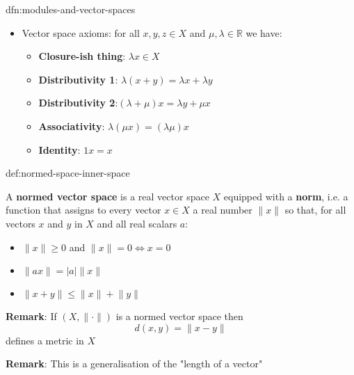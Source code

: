 \documentclass[landscape, 8pt]{extarticle}
\begin{document}
\begin{multicols}{3}
\begin{dfn}{dfn:modules-and-vector-spaces}{}
\begin{itemize}[leftmargin=*]
            \item Vector space axioms: for all $x,y,z\in X$ and $\mu, \lambda \in \mathbb{R}$ we have:
                \vspace{-5pt}
                \begin{itemize}
                    \item \textbf{Closure-ish thing}: $\lambda x\in X$
                    \item \textbf{Distributivity 1}: $\lambda(x + y) = \lambda x + \lambda y$
                    \item \textbf{Distributivity 2}:$(\lambda + \mu)x = \lambda y + \mu x$
                    \item \textbf{Associativity}: $\lambda (\mu x) = (\lambda \mu) x$
                    \item \textbf{Identity}: $1x = x$
                \end{itemize}
    \end{itemize}
\end{dfn}

\vspace{-5pt}
\begin{dfn}{def:normed-space-inner-space}{}
    \vspace{-5pt}

    \vspace{-2pt}
    A \textbf{normed vector space} is a real vector space $X$ equipped with a \textbf{norm}, i.e. a function that assigns to every vector $x\in X$ a real number $\lVert x \rVert$ so that, for all vectors $x$ and $y$ in $X$ and all real scalars $a$:

    \vspace{-5pt}
    \begin{itemize}
        \item $\lVert x\rVert\ge 0 $ and $\lVert x \rVert = 0 \iff x = 0$
        \item $\lVert ax \rVert = \lvert a \rvert\lVert x \rVert$
        \item $\lVert x+y \rVert\le \lVert x \rVert + \lVert y \rVert$
    \end{itemize}

    \vspace{-7pt}
    \longrule{0.08ex}
    \textbf{Remark}: If $(X, \lVert \cdot \rVert)$ is a normed vector space then
    \[d(x,y) = \lVert x - y \rVert\]
    defines a metric in $X$

    \textbf{Remark}: This is a generalisation of the "length of a vector"



\end{dfn}
\end{multicols}
\end{document}
